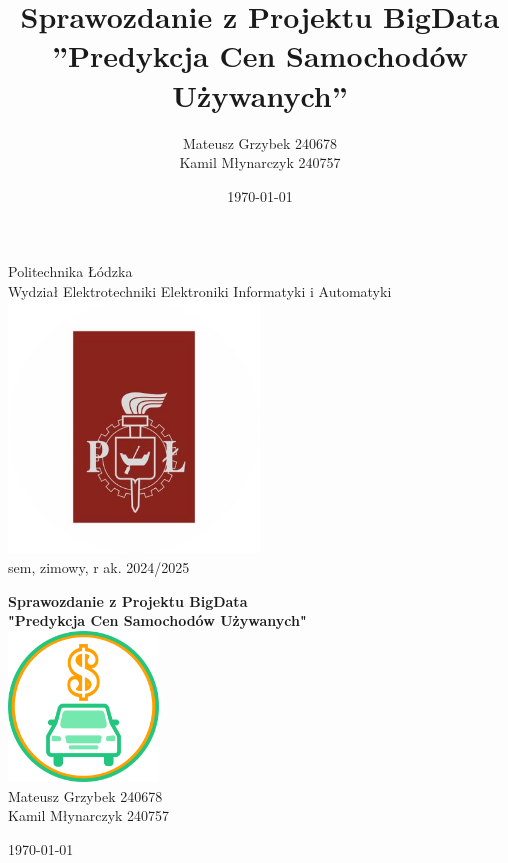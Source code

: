 \documentclass[12pt, a4paper]{report}
\title{
Sprawozdanie z Projektu BigData\\ 
''Predykcja Cen Samochodów Używanych''
}
\author{
    Mateusz Grzybek 240678\\
    Kamil Młynarczyk  240757
}
\date{\today}
\begin{document}
\begin{titlepage}
    \centering

    {\Huge Politechnika Łódzka \\[0.5cm]}
    {\Large Wydział Elektrotechniki Elektroniki Informatyki i Automatyki \\[0cm]}
    \includegraphics[width=0.5\textwidth]{images/university_logo}
    {\\[0cm] sem, zimowy, r ak. 2024/2025 \\[1cm]}
    
    {\Large \textbf{
        Sprawozdanie z Projektu BigData \\
        "Predykcja Cen Samochodów Używanych" \\[0.2cm]
    }}
    \includegraphics[width=0.3\textwidth]{images/project_logo.png}
    {\\[0.3cm]}
    {\Large Mateusz Grzybek 240678 \\[0.2cm] Kamil Młynarczyk 240757 \\[1cm]}

    {\Large \today}

\end{titlepage}
\end{document}
